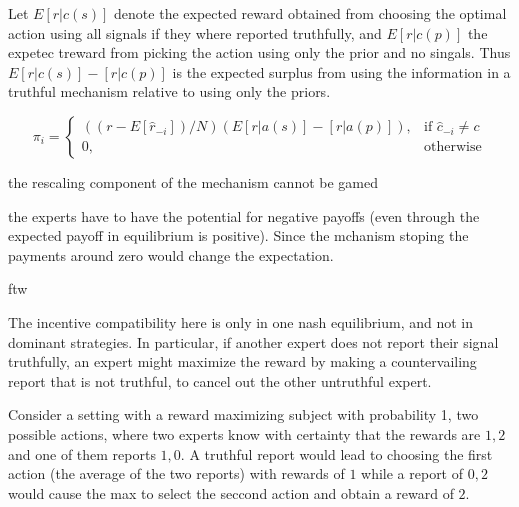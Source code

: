 \begin{eg}

Let $E[r|c(s)]$ denote the expected reward obtained from choosing the optimal action using all signals if they where reported truthfully, and $E[r|c(p)] $ the expetec treward from picking the action using only the prior and no singals. Thus $E[r|c(s)] - [r|c(p)] $ is the expected surplus from using the information in a truthful mechanism relative to using only the priors.

\[
    \pi_i = 
\begin{cases}
    ((r - E[\hat{r}_{-i}] ) / N )       (E[r|a(s)] - [r|a(p)] )          ,& \text{if } \hat{c}_{-i} \neq c\\
    0,              & \text{otherwise}
\end{cases}
\]

\end{eg}


\begin{lem}
	the rescaling component of the mechanism cannot be gamed
\end{lem}





the experts have to have the potential for negative payoffs (even through the expected payoff in equilibrium is positive). Since the mchanism stoping the payments around zero would change the expectation. 





\begin{defn}
	ftw
\end{defn}

The incentive compatibility here is only in one nash equilibrium, and not in dominant strategies. In particular, if another expert does not report their signal truthfully, an expert might maximize the reward by making a countervailing report that is not truthful, to cancel out the other untruthful expert. 

\begin{eg}
	Consider a setting with a reward maximizing subject with probability 1, two possible actions, where two experts know with certainty that the rewards are $1,2$ and one of them reports $1,0$. A truthful report would lead to choosing the first action (the average of the two reports) with rewards of $1$ while a report of $0,2$ would cause the max to select the seccond action and obtain a reward of $2$.
\end{eg}


